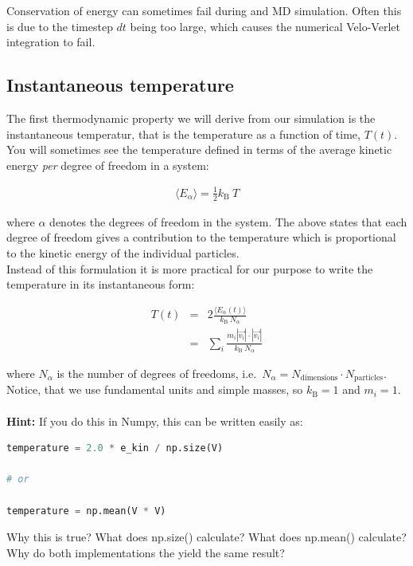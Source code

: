 \documentclass{article}
\begin{document}
Conservation of energy can sometimes fail during and MD simulation. Often this
is due to the timestep $dt$ being too large, which causes the numerical
Velo-Verlet integration to fail.

\subsection{Instantaneous temperature}

The first thermodynamic property we will derive from our simulation is the instantaneous temperatur, that is the temperature as a function of time, $T(t)$.
You will sometimes see the temperature defined in terms of the average kinetic energy \textit{per} degree of freedom in a system:

\begin{eqnarray}
    \langle E_{\alpha} \rangle = \frac{1}{2} k_\mathrm{B} \ T
\end{eqnarray}

where $\alpha$ denotes the degrees of freedom in the system. The above states that each degree of freedom gives a contribution to the temperature which is proportional to the kinetic energy of the individual particles.\\
Instead of this formulation it is more practical for our purpose to write the temperature in its instantaneous form:

\begin{eqnarray}
    T(t) &=& 2 \frac{\langle E_{\alpha}(t) \rangle}{k_\mathrm{B} \ N_\alpha }\\
         &=& \sum_i \frac{m_i|\vec{v_i}| \cdot |\vec{v_i}|}{k_\mathrm{B} \ N_\alpha}
\end{eqnarray}

where $N_\alpha$ is the number of degrees of freedoms, i.e.~$N_\alpha = N_{\mathrm{dimensions}} \cdot N_{\mathrm{particles}}$. Notice, that we use fundamental units and simple masses, so $k_\mathrm{B} = 1$ and $m_i = 1$.\\\\

\textbf{Hint:} If you do this in Numpy, this can be written easily as:
\begin{lstlisting}[language=python]
temperature = 2.0 * e_kin / np.size(V)

# or

temperature = np.mean(V * V)
\end{lstlisting}

Why this is true? What does np.size() calculate? What does np.mean() calculate?
Why do both implementations the yield the same result?
\end{document}
